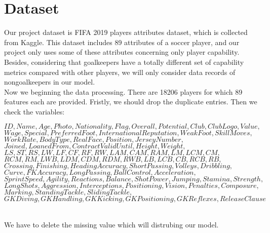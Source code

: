 \documentclass{article}
\begin{document}
\section*{Dataset}
Our project dataset is FIFA 2019 players attributes dataset, which is collected
from Kaggle. This dataset includes 89 attributes of a soccer player, and our
project only uses some of these attributes concerning only player capability.
Besides, considering that goalkeepers have a totally different set of capability
metrics compared with other players, we will only consider data records of nongoalkeepers in our model.\\
Now we beginning the data processing.
There are 18206 players for which 89 features each are provided. Fristly, we should drop the duplicate entries. 
Then we check the variables: 
\begin{center}
$ID, Name, Age, Photo, Nationality, Flag, Overall, Potential, Club, Club Logo, Value,$\\ 
$Wage, Special, Preferred Foot, International Reputation, Weak Foot, Skill Moves,$\\
$Work Rate, Body Type, Real Face, Position, Jersey Number, $\\
$Joined, Loaned From, Contract Valid Until,Height, Weight,$\\
$LS, ST, RS, LW, LF, CF, RF, RW, LAM, CAM, RAM, LM, LCM, CM,$\\
$RCM, RM, LWB, LDM, CDM, RDM, RWB, LB, LCB, CB, RCB, RB,$ \\
$Crossing, Finishing, HeadingAccuracy, ShortPassing, Volleys, Dribbling,$\\ 
$Curve, FKAccuracy, LongPassing, BallControl, Acceleration,$\\ 
$SprintSpeed, Agility, Reactions, Balance, ShotPower, Jumping, Stamina, Strength,$\\ $LongShots, Aggression, Interceptions, Positioning, Vision, Penalties, Composure,$\\ $Marking, StandingTackle, SlidingTackle,$\\
$GKDiving, GKHandling, GKKicking, GKPositioning,
GKReflexes, Release Clause$
\end{center}
\\
We have to delete the missing value which will distrubing our model. 
\end{document}
